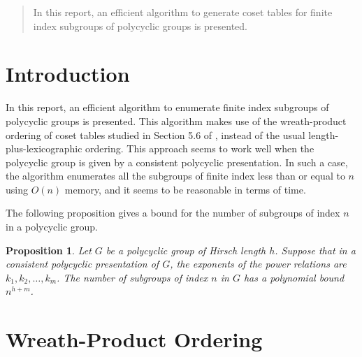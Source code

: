 \documentclass[12 pt]{article}
\def\bfZ{{\bf Z}}
\newtheorem{proposition}[theorem]{Proposition}
\begin{document}

\author{Eddie H. Lo\\ Department of Defense\\ Fort Meade, Maryland\\
        ehlo@afterlife.ncsc.mil}
\date{\today}
\maketitle



\begin{abstract}
In this report, an efficient algorithm to generate coset tables for
finite index subgroups of polycyclic groups is presented.
\end{abstract}

\section{Introduction}

In this report, an efficient algorithm to enumerate finite index
subgroups of polycyclic groups is presented. This algorithm
makes use of the wreath-product ordering of coset tables
studied in Section 5.6 of \cite{Sims94}, instead of the
usual length-plus-lexicographic ordering. This approach seems
to work well when the polycyclic group is given by a consistent
polycyclic presentation. In such a case, the algorithm enumerates
all the subgroups of finite index less than or equal to $n$ using
$O(n)$ memory, and it seems to be reasonable
in terms of time.

The following proposition gives a bound for the number of subgroups
of index $n$ in a polycyclic group.

\begin{proposition}
Let $G$ be a polycyclic group of Hirsch length $h$. Suppose that
in a consistent polycyclic presentation of $G$,
the exponents of the power relations are $k_1,k_2,\ldots,
k_m$.
The number of subgroups of index $n$ in $G$ has a polynomial
bound $n^{h+m}$.
\end{proposition}

\section{Wreath-Product Ordering}
\end{document}
